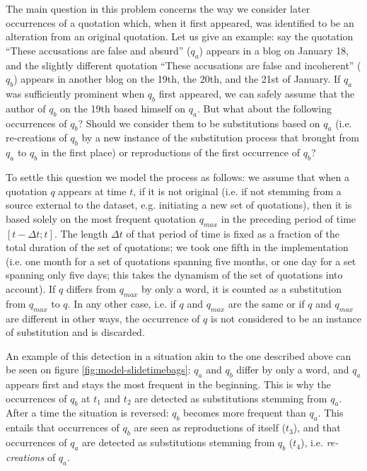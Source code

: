 The main question in this problem concerns the way we consider later occurrences of a quotation which, when it first appeared, was identified to be an alteration from an original quotation.
Let us give an example: say the quotation ``These accusations are false and absurd'' ($q_a$) appears in a blog on January 18, and the slightly different quotation ``These accusations are false and incoherent'' ($q_b$) appears in another blog on the 19th, the 20th, and the 21st of January.
If $q_a$ was sufficiently prominent when $q_b$ first appeared, we can safely assume that the author of $q_b$ on the 19th based himself on $q_a$.
But what about the following occurrences of $q_b$?
Should we consider them to be substitutions based on $q_a$ (i.e. re-creations of $q_b$ by a new instance of the substitution process that brought from $q_a$ to $q_b$ in the first place) or reproductions of the first occurrence of $q_b$?

To settle this question we model the process as follows: we assume that when a quotation $q$ appears at time $t$, if it is not original (i.e. if not stemming from a source external to the dataset, e.g. initiating a new set of quotations), then it is based solely on the most frequent quotation $q_{max}$ in the preceding period of time $[t - \Delta t ; t]$.
The length $\Delta t$ of that period of time is fixed as a fraction of the total duration of the set of quotations; we took one fifth in the implementation (i.e. one month for a set of quotations spanning five months, or one day for a set spanning only five days; this takes the dynamism of the set of quotations into account).
If $q$ differs from $q_{max}$ by only a word, it is counted as a substitution from $q_{max}$ to $q$.
In any other case, i.e. if $q$ and $q_{max}$ are the same or if $q$ and $q_{max}$ are different in other ways, the occurrence of $q$ is not considered to be an instance of substitution and is discarded.

An example of this detection in a situation akin to the one described above can be seen on figure \ref{fig:model-slidetimebags}: $q_a$ and $q_b$ differ by only a word, and $q_a$ appears first and stays the most frequent in the beginning.
This is why the occurrences of $q_b$ at $t_1$ and $t_2$ are detected as substitutions stemming from $q_a$.
After a time the situation is reversed: $q_b$ becomes more frequent than $q_a$.
This entails that occurrences of $q_b$ are seen as reproductions of itself ($t_3$), and that occurrences of $q_a$ are detected as substitutions stemming from $q_b$ ($t_4$), i.e. \emph{re-creations} of $q_a$.

